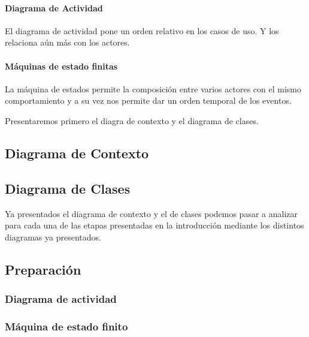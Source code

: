 \paragraph{Diagrama de Actividad}

El diagrama de actividad pone un orden relativo en los casos de uso. Y los relaciona aún más con los actores.

\paragraph{Máquinas de estado finitas}

La máquina de estados permite la composición entre varios actores con el mismo comportamiento y a su vez nos permite dar un orden temporal de los eventos. 


Presentaremos primero el diagra de contexto y el diagrama de clases.

\subsection{Diagrama de Contexto}


\subsection{Diagrama de Clases}

Ya presentados el diagrama de contexto y el de clases podemos pasar a analizar para cada una de las etapas presentadas en la introducción mediante los distintos diagramas ya presentados.

\subsection{Preparación}


\subsubsection{Diagrama de actividad}

\begin{figure}[H]
\centering
\end{figure}

\subsubsection{Máquina de estado finito}

